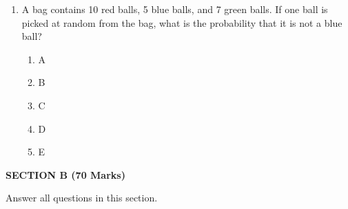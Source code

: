\documentclass[12pt]{article}
\newcommand{\centerheading}[1]{
    \vspace{0.6em}
    \begin{center}
        {\fontsize{13}{15}\selectfont\bfseries #1}
    \end{center}
    \vspace{0.15em}
}
\newenvironment{questionblock}[1][10]{
    \par\Needspace{#1\baselineskip}
}{
    \par
}
\begin{document}
\begin{enumerate}
\begin{enumerate}[label=(\roman*)]
    \begin{questionblock}
      \item A bag contains 10 red balls, 5 blue balls, and 7 green balls. If one ball is picked at random from the bag, what is the probability that it is not a blue ball?
      \begin{enumerate}[label=\Alph*.]
        \item A
        \item B
        \item C
        \item D
        \item E
      \end{enumerate}
      \vspace{0.8em}
    \end{questionblock}

  \end{enumerate}

\end{enumerate}

\centerheading{SECTION B (70 Marks)}
\vspace{-2.0em}
\begin{center}
  Answer all questions in this section.
\end{center}
\vspace{-2.0em}
\end{document}
